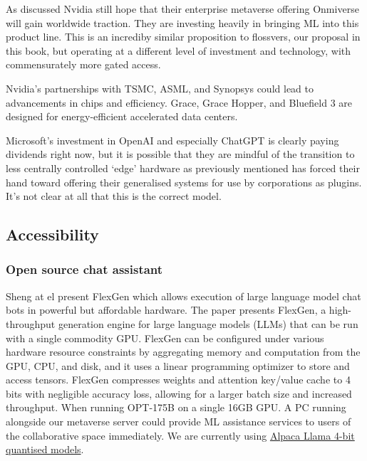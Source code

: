 As discussed Nvidia still hope that their enterprise metaverse offering Onmiverse will gain worldwide traction. They are investing heavily in bringing ML into this product line. This is an incrediby similar proposition to flossvers, our proposal in this book, but operating at a different level of investment and technology, with commensurately more gated access. \par
Nvidia's partnerships with TSMC, ASML, and Synopsys could lead to advancements in chips and efficiency. Grace, Grace Hopper, and Bluefield 3 are designed for energy-efficient accelerated data centers.\par
Microsoft's investment in OpenAI and especially ChatGPT is clearly paying dividends right now, but it is possible that they are mindful of the transition to less centrally controlled `edge' hardware as previously mentioned has forced their hand toward offering their generalised systems for use by corporations as plugins. It's not clear at all that this is the correct model.
\subsection{Accessibility}
\subsubsection{Open source chat assistant}
Sheng at el present FlexGen which allows execution of large language model chat bots in powerful but affordable hardware\cite{Sheng2023}. The paper presents FlexGen, a high-throughput generation engine for large language models (LLMs) that can be run with a single commodity GPU. FlexGen can be configured under various hardware resource constraints by aggregating memory and computation from the GPU, CPU, and disk, and it uses a linear programming optimizer to store and access tensors. FlexGen compresses weights and attention key/value cache to 4 bits with negligible accuracy loss, allowing for a larger batch size and increased throughput. When running OPT-175B on a single 16GB GPU. A PC running alongside our metaverse server could provide ML assistance services to users of the collaborative space immediately. We are currently using \href{https://huggingface.co/Pi3141/alpaca-lora-30B-ggml/tree/main}{Alpaca Llama 4-bit quantised models}.

